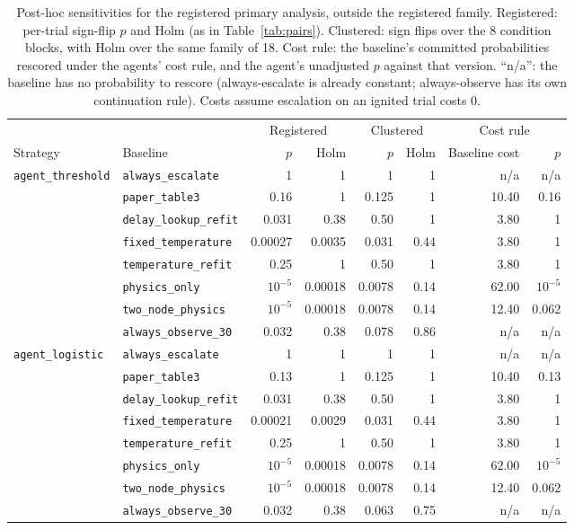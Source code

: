 \documentclass[11pt]{article}
\begin{document}
\begin{table}[t]
\centering\small
\caption{Post-hoc sensitivities for the registered primary analysis, outside the registered family. Registered:
per-trial sign-flip $p$ and Holm (as in Table~\ref{tab:pairs}). Clustered: sign flips over the 8 condition blocks,
with Holm over the same family of 18. Cost rule: the baseline's committed probabilities rescored under the agents'
cost rule, and the agent's unadjusted $p$ against that version. ``n/a'': the baseline has no probability to rescore
(always-escalate is already constant; always-observe has its own continuation rule). Costs assume escalation on an
ignited trial costs 0.}
\label{tab:posthoc}
\setlength{\tabcolsep}{4pt}
\begin{tabular}{@{}llrrrrrr@{}}
\toprule
& & \multicolumn{2}{c}{Registered} & \multicolumn{2}{c}{Clustered} & \multicolumn{2}{c}{Cost rule} \\
\cmidrule(lr){3-4}\cmidrule(lr){5-6}\cmidrule(l){7-8}
Strategy & Baseline & $p$ & Holm & $p$ & Holm & Baseline cost & $p$ \\
\midrule
\texttt{agent\_threshold} & \texttt{always\_escalate} & 1 & 1 & 1 & 1 & n/a & n/a \\
 & \texttt{paper\_table3} & 0.16 & 1 & 0.125 & 1 & 10.40 & 0.16 \\
 & \texttt{delay\_lookup\_refit} & 0.031 & 0.38 & 0.50 & 1 & 3.80 & 1 \\
 & \texttt{fixed\_temperature} & 0.00027 & 0.0035 & 0.031 & 0.44 & 3.80 & 1 \\
 & \texttt{temperature\_refit} & 0.25 & 1 & 0.50 & 1 & 3.80 & 1 \\
 & \texttt{physics\_only} & $10^{-5}$ & 0.00018 & 0.0078 & 0.14 & 62.00 & $10^{-5}$ \\
 & \texttt{two\_node\_physics} & $10^{-5}$ & 0.00018 & 0.0078 & 0.14 & 12.40 & 0.062 \\
 & \texttt{always\_observe\_30} & 0.032 & 0.38 & 0.078 & 0.86 & n/a & n/a \\
\midrule
\texttt{agent\_logistic} & \texttt{always\_escalate} & 1 & 1 & 1 & 1 & n/a & n/a \\
 & \texttt{paper\_table3} & 0.13 & 1 & 0.125 & 1 & 10.40 & 0.13 \\
 & \texttt{delay\_lookup\_refit} & 0.031 & 0.38 & 0.50 & 1 & 3.80 & 1 \\
 & \texttt{fixed\_temperature} & 0.00021 & 0.0029 & 0.031 & 0.44 & 3.80 & 1 \\
 & \texttt{temperature\_refit} & 0.25 & 1 & 0.50 & 1 & 3.80 & 1 \\
 & \texttt{physics\_only} & $10^{-5}$ & 0.00018 & 0.0078 & 0.14 & 62.00 & $10^{-5}$ \\
 & \texttt{two\_node\_physics} & $10^{-5}$ & 0.00018 & 0.0078 & 0.14 & 12.40 & 0.062 \\
 & \texttt{always\_observe\_30} & 0.032 & 0.38 & 0.063 & 0.75 & n/a & n/a \\
\bottomrule
\end{tabular}
\end{table}
\end{document}
